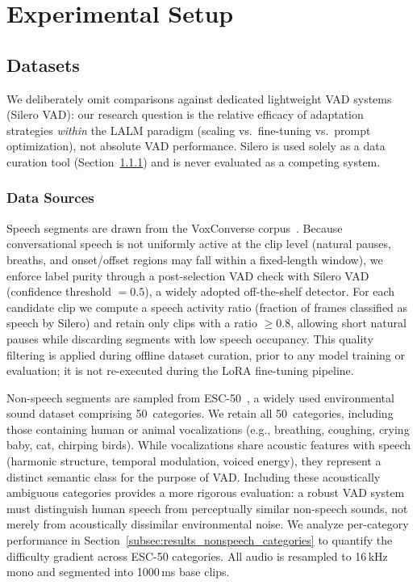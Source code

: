 \documentclass[11pt,a4paper]{article}
\begin{document}
\section{Experimental Setup}
\label{sec:setup}

\subsection{Datasets}
\label{subsec:datasets}

We deliberately omit comparisons against dedicated lightweight VAD systems (Silero VAD): our research question is the relative efficacy of adaptation strategies \textit{within} the LALM paradigm (scaling vs.\ fine-tuning vs.\ prompt optimization), not absolute VAD performance. Silero is used solely as a data curation tool (Section~\ref{subsubsec:data_sources}) and is never evaluated as a competing system.

\subsubsection{Data Sources}
\label{subsubsec:data_sources}

Speech segments are drawn from the VoxConverse corpus~\cite{chung2020spot}. Because conversational speech is not uniformly active at the clip level (natural pauses, breaths, and onset/offset regions may fall within a fixed-length window), we enforce label purity through a post-selection VAD check with Silero VAD~\cite{silero_vad_github} (confidence threshold $= 0.5$), a widely adopted off-the-shelf detector. For each candidate clip we compute a speech activity ratio (fraction of frames classified as speech by Silero) and retain only clips with a ratio $\geq 0.8$, allowing short natural pauses while discarding segments with low speech occupancy. This quality filtering is applied during offline dataset curation, prior to any model training or evaluation; it is not re-executed during the LoRA fine-tuning pipeline.

Non-speech segments are sampled from ESC-50~\cite{piczak2015esc}, a widely used environmental sound dataset comprising 50~categories. We retain all 50~categories, including those containing human or animal vocalizations (e.g., breathing, coughing, crying baby, cat, chirping birds). While vocalizations share acoustic features with speech (harmonic structure, temporal modulation, voiced energy), they represent a distinct semantic class for the purpose of VAD. Including these acoustically ambiguous categories provides a more rigorous evaluation: a robust VAD system must distinguish human speech from perceptually similar non-speech sounds, not merely from acoustically dissimilar environmental noise. We analyze per-category performance in Section~\ref{subsec:results_nonspeech_categories} to quantify the difficulty gradient across ESC-50 categories. All audio is resampled to 16\,kHz mono and segmented into 1000\,ms base clips.
\end{document}
